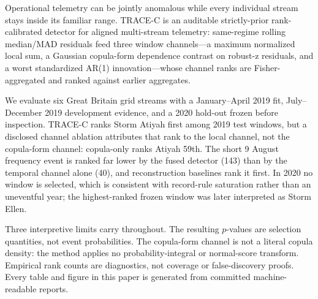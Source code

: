 Operational telemetry can be jointly anomalous while every individual stream
stays inside its familiar range. TRACE-C is an auditable strictly-prior
rank-calibrated detector for aligned multi-stream telemetry: same-regime
rolling median/MAD residuals feed three window channels---a maximum normalized
local sum, a Gaussian copula-form dependence contrast on robust-z residuals,
and a worst standardized AR(1) innovation---whose channel ranks are
Fisher-aggregated and ranked against earlier aggregates.

We evaluate six Great Britain grid streams with a January--April 2019 fit,
July--December 2019 development evidence, and a 2020 hold-out frozen before
inspection. TRACE-C ranks Storm Atiyah first among 2019 test windows, but a
disclosed channel ablation attributes that rank to the local channel, not the
copula-form channel: copula-only ranks Atiyah 59th. The short 9 August
frequency event is ranked far
lower by the fused detector (143) than by the temporal channel alone (40), and
reconstruction baselines rank it first. In 2020 no window is selected, which is
consistent with record-rule saturation rather than an uneventful year; the
highest-ranked frozen window was later interpreted as Storm Ellen.

Three interpretive limits carry throughout. The resulting $p$-values are
selection quantities, not event probabilities. The copula-form channel is not a
literal copula density: the method applies no probability-integral or
normal-score transform. Empirical rank counts are diagnostics, not coverage or
false-discovery proofs. Every table and figure in this paper is generated from
committed machine-readable reports.
